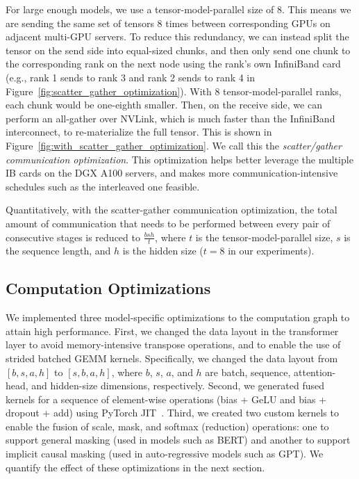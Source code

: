 \documentclass[sigconf,nonacm]{acmart}
\begin{document}
For large enough models, we use a tensor-model-parallel size of 8. This means we are sending the same set of tensors 8 times between corresponding GPUs on adjacent multi-GPU servers. To reduce this redundancy, we can instead split the tensor on the send side into equal-sized chunks, and then only send one chunk to the corresponding rank on the next node using the rank's own InfiniBand card (e.g., rank 1 sends to rank 3 and rank 2 sends to rank 4 in Figure~\ref{fig:scatter_gather_optimization}). With 8 tensor-model-parallel ranks, each chunk would be one-eighth smaller. Then, on the receive side, we can perform an all-gather over NVLink, which is much faster than the InfiniBand interconnect, to re-materialize the full tensor. This is shown in Figure~\ref{fig:with_scatter_gather_optimization}. We call this the \emph{scatter/gather communication optimization}. This optimization helps better leverage the multiple IB cards on the DGX A100 servers, and makes more communication-intensive schedules such as the interleaved one feasible.

Quantitatively, with the scatter-gather communication optimization, the total amount of communication that needs to be performed between every pair of consecutive stages is reduced to $\frac{bsh}{t}$, where $t$ is the tensor-model-parallel size, $s$ is the sequence length, and $h$ is the hidden size ($t=8$ in our experiments).

\subsection{Computation Optimizations}
\label{sec:computation_optimizations}

We implemented three model-specific optimizations to the computation graph to attain high performance. First, we changed the data layout in the transformer layer to avoid memory-intensive transpose operations, and to enable the use of strided batched GEMM kernels. Specifically, we changed the data layout from $[b, s, a, h]$ to $[s, b, a, h]$, where $b$, $s$, $a$, and $h$ are batch, sequence, attention-head, and hidden-size dimensions, respectively. Second, we generated fused kernels for a sequence of element-wise operations (bias + GeLU and bias + dropout + add) using PyTorch JIT~\cite{pytorchjit}. Third, we created two custom kernels to enable the fusion of scale, mask, and softmax (reduction) operations: one to support general masking (used in models such as BERT) and another to support implicit causal masking (used in auto-regressive models such as GPT). We quantify the effect of these optimizations in the next section.
\end{document}
